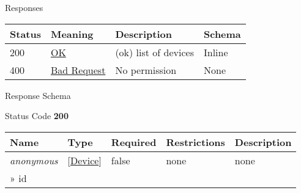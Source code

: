 \documentclass[
]{article}
\begin{document}
Responses

\begin{longtable}[]{@{}llll@{}}
\toprule
Status & Meaning & Description & Schema\tabularnewline
\midrule
\endhead
200 & \href{https://tools.ietf.org/html/rfc7231\#section-6.3.1}{OK} &
(ok) list of devices & Inline\tabularnewline
400 & \href{https://tools.ietf.org/html/rfc7231\#section-6.5.1}{Bad
Request} & No permission & None\tabularnewline
\bottomrule
\end{longtable}

Response Schema

Status Code \textbf{200}

\begin{longtable}[]{@{}lllll@{}}
\toprule
\begin{minipage}[b]{0.17\columnwidth}\raggedright
Name\strut
\end{minipage} & \begin{minipage}[b]{0.17\columnwidth}\raggedright
Type\strut
\end{minipage} & \begin{minipage}[b]{0.17\columnwidth}\raggedright
Required\strut
\end{minipage} & \begin{minipage}[b]{0.17\columnwidth}\raggedright
Restrictions\strut
\end{minipage} & \begin{minipage}[b]{0.17\columnwidth}\raggedright
Description\strut
\end{minipage}\tabularnewline
\midrule
\endhead
\begin{minipage}[t]{0.17\columnwidth}\raggedright
\emph{anonymous}\strut
\end{minipage} & \begin{minipage}[t]{0.17\columnwidth}\raggedright
{[}\protect\hyperlink{schemadevice}{Device}{]}\strut
\end{minipage} & \begin{minipage}[t]{0.17\columnwidth}\raggedright
false\strut
\end{minipage} & \begin{minipage}[t]{0.17\columnwidth}\raggedright
none\strut
\end{minipage} & \begin{minipage}[t]{0.17\columnwidth}\raggedright
none\strut
\end{minipage}\tabularnewline
\begin{minipage}[t]{0.17\columnwidth}\raggedright
» id\strut
\end{minipage} & \begin{minipage}[t]{0.17\columnwidth}\raggedright

\end{minipage}
\end{longtable}
\end{document}
